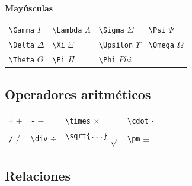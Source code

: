 \documentclass[
  spanish,
  a4paper,
]{scrreport}
\newcounter{none} %
\theoremstyle{definition}
\theoremstyle{remark}
\begin{document}
\textbf{Mayúsculas}

{\def\LTcaptype{none} %
\begin{longtable}[]{@{}
  >{\raggedright\arraybackslash}p{}
  >{\raggedright\arraybackslash}p{}
  >{\raggedright\arraybackslash}p{}
  >{\raggedright\arraybackslash}p{}@{}}
\toprule\noalign{}
\endhead
\bottomrule\noalign{}
\endlastfoot
\texttt{\textbackslash{}Gamma} \(\Gamma\) &
\texttt{\textbackslash{}Lambda} \(\Lambda\) &
\texttt{\textbackslash{}Sigma} \(\Sigma\) & \texttt{\textbackslash{}Psi}
\(\Psi\) \\
\texttt{\textbackslash{}Delta} \(\Delta\) & \texttt{\textbackslash{}Xi}
\(\Xi\) & \texttt{\textbackslash{}Upsilon} \(\Upsilon\) &
\texttt{\textbackslash{}Omega} \(\Omega\) \\
\texttt{\textbackslash{}Theta} \(\Theta\) & \texttt{\textbackslash{}Pi}
\(\Pi\) & \texttt{\textbackslash{}Phi} \(Phi\) & \\
\end{longtable}
}

\subsection{Operadores aritméticos}\label{operadores-aritmuxe9ticos}

{\def\LTcaptype{none} %
\begin{longtable}[]{@{}llll@{}}
\toprule\noalign{}
\endhead
\bottomrule\noalign{}
\endlastfoot
\texttt{+} \(+\) & \texttt{-} \(-\) & \texttt{\textbackslash{}times}
\(\times\) & \texttt{\textbackslash{}cdot} \(\cdot\) \\
\texttt{/} \(/\) & \texttt{\textbackslash{}div} \(\div\) &
\texttt{\textbackslash{}sqrt\{...\}} \(\sqrt{}\) &
\texttt{\textbackslash{}pm} \(\pm\) \\
\end{longtable}
}

\subsection{Relaciones}\label{relaciones}
\end{document}
